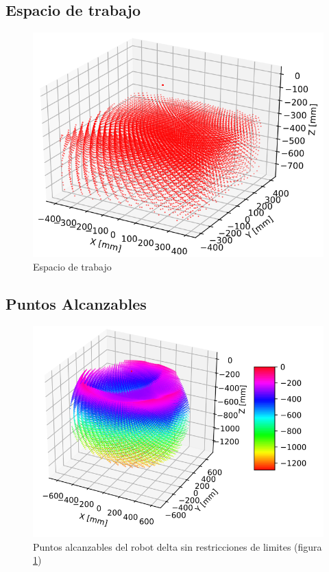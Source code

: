         \newpage

        \subsection{Espacio de trabajo}
        \begin{figure}[h]
            \centering
            \includegraphics[width=0.55\linewidth]{Main/Chapter7/Images7/ws_6.png}
            \caption{Espacio de trabajo}
            \label{f:cap7_ws6}
        \end{figure}
        
    \subsection{Puntos Alcanzables}
        \begin{figure}[h]
            \centering
            \includegraphics[width=0.82\linewidth]{Main/Chapter7/Images7/ws_1.png}
            \caption{Puntos alcanzables del robot delta sin restricciones de limites (figura \ref{f:cap7_ws6})}
            \label{f:cap7_ws1}
        \end{figure}    
        

